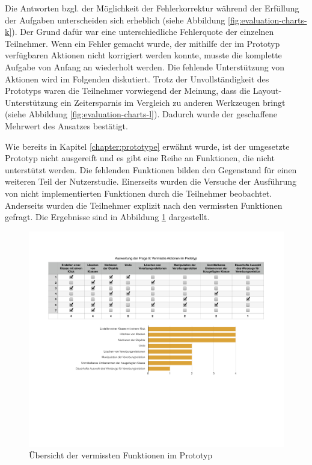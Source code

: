 Die Antworten bzgl. der Möglichkeit der Fehlerkorrektur während der Erfüllung der Aufgaben unterscheiden sich erheblich (siehe Abbildung \ref{fig:evaluation-charts-k}). Der Grund dafür war eine unterschiedliche Fehlerquote der einzelnen Teilnehmer. Wenn ein Fehler gemacht wurde, der mithilfe der im Prototyp verfügbaren Aktionen nicht korrigiert werden konnte, musste die komplette Aufgabe von Anfang an wiederholt werden. Die fehlende Unterstützung von Aktionen wird im Folgenden diskutiert. Trotz der Unvollständigkeit des Prototyps waren die Teilnehmer vorwiegend der Meinung, dass die Layout-Unterstützung ein Zeitersparnis im Vergleich zu anderen Werkzeugen bringt (siehe Abbildung \ref{fig:evaluation-charts-l}). Dadurch wurde der geschaffene Mehrwert des Ansatzes bestätigt.

Wie bereits in Kapitel \ref{chapter:prototype} erwähnt wurde, ist der umgesetzte Prototyp nicht ausgereift und es gibt eine Reihe an Funktionen, die nicht unterstützt werden. Die fehlenden Funktionen bilden den Gegenstand für einen weiteren Teil der Nutzerstudie. Einerseits wurden die Versuche der Ausführung von nicht implementierten Funktionen durch die Teilnehmer beobachtet. Anderseits wurden die Teilnehmer explizit nach den vermissten Funktionen gefragt. Die Ergebnisse sind in Abbildung \ref{fig:missed-prototype-functions} dargestellt.

\begin{figure}[hbt]
    \centering
    \includegraphics[width=\textwidth]{assets/missed-prototype-functions}
    \caption{Übersicht der vermissten Funktionen im Prototyp}
    \label{fig:missed-prototype-functions}
\end{figure}

